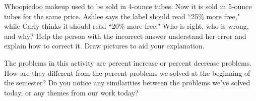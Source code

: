 \documentclass[noauthor,nooutcomes, handout]{ximera}
\begin{document}
\begin{problem}
 Whoopiedoo makeup used to be sold in 4-ounce tubes.  Now it is sold in 5-ounce tubes for the same price.  Ashlee says the label should read ``25$\%$ more free," while Carly thinks it should read ``20$\%$ more free."  Who is right, who is wrong, and why?  Help the person with the incorrect answer understand her error and explain how to correct it.   Draw pictures to aid your explanation.

\end{problem}



\begin{problem}
The problems in this activity are percent increase or percent decrease problems. How are they different from the percent problems we solved at the beginning of the semester? Do you notice any similarities between the problems we've solved today, or any themes from our work today?
\end{problem}






\newpage
\end{document}
